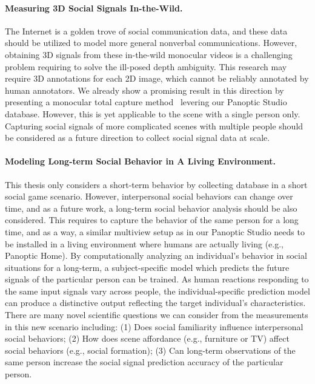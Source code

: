 \paragraph{Measuring 3D Social Signals In-the-Wild.}
The Internet is a golden trove of social communication data, and these data should be utilized to model more general nonverbal communications. However, obtaining 3D signals from these in-the-wild monocular videos is a challenging problem requiring to solve the ill-posed depth ambiguity. This research may require 3D annotations for each 2D image, which cannot be reliably annotated by human annotators. We already show a promising result in this direction by presenting a monocular total capture method~\cite{Xiang2019} levering our Panoptic Studio database. However, this is yet applicable to the scene with a single person only. Capturing social signals of more complicated scenes with multiple people should be considered as a future direction to collect social signal data at scale.

\paragraph{Modeling Long-term Social Behavior in A Living Environment.}
This thesis only considers a short-term behavior by collecting database in a short social game scenario. However, interpersonal social behaviors can change over time, and as a future work, a long-term social behavior analysis should be also considered. This requires to capture the behavior of the same person for a long time, and as a way, a similar multiview setup as in our Panoptic Studio needs to be installed in a living environment where humans are actually living (e.g., Panoptic Home). By computationally analyzing an individual's behavior in social situations for a long-term, a subject-specific model which predicts the future signals of the particular person can be trained. As human reactions responding to the same input signals vary across people, the individual-specific prediction model can produce a distinctive output reflecting the target individual's characteristics. There are many novel scientific questions we can consider from the measurements in this new scenario including: (1) Does social familiarity influence interpersonal social behaviors; (2) How does scene affordance (e.g., furniture or TV) affect social behaviors (e.g., social formation); (3) Can long-term observations of the same person increase the social signal prediction accuracy of the particular person. 
